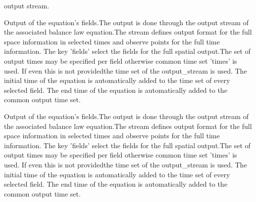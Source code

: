 \begin{RecordType}{}{}{}{}
{{{output stream.}}}\end{RecordType}\begin{RecordType}{}{}{}{}{{{Output of the equation's fields.The output is done through the output stream of the associated balance law equation.The stream defines output format for the full space information in selected times and observe points for the full time information. The key 'fields' select the fields for the full spatial output.The set of output times may be specified  per field otherwise common time set 'times' is used. If even this is not providedthe time set of the output{\_}stream is used. The initial time of the equation is automatically added to the time set of every selected field. The end time of the equation is automatically added to the common output time set.}}}\end{RecordType}\begin{RecordType}{}{}{}{}{{{Output of the equation's fields.The output is done through the output stream of the associated balance law equation.The stream defines output format for the full space information in selected times and observe points for the full time information. The key 'fields' select the fields for the full spatial output.The set of output times may be specified  per field otherwise common time set 'times' is used. If even this is not providedthe time set of the output{\_}stream is used. The initial time of the equation is automatically added to the time set of every selected field. The end time of the equation is automatically added to the common output time set.}}}
\end{RecordType}
